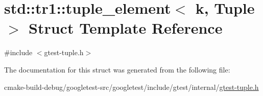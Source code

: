 \hypertarget{structstd_1_1tr1_1_1tuple__element}{}\section{std\+::tr1\+::tuple\+\_\+element$<$ k, Tuple $>$ Struct Template Reference}
\label{structstd_1_1tr1_1_1tuple__element}


{\ttfamily \#include $<$gtest-\/tuple.\+h$>$}



The documentation for this struct was generated from the following file\+:\begin{DoxyCompactItemize}
\item 
cmake-\/build-\/debug/googletest-\/src/googletest/include/gtest/internal/\mbox{\hyperlink{gtest-tuple_8h}{gtest-\/tuple.\+h}}\end{DoxyCompactItemize}
